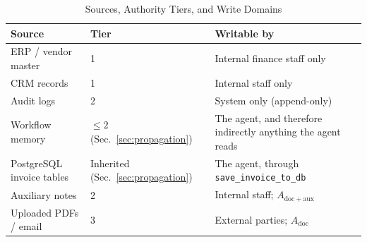 \documentclass[conference]{IEEEtran}
\newenvironment{added}{\bfseries}{}
\begin{document}
\begin{table}[t]
\centering
\begin{added}
\caption{Sources, Authority Tiers, and Write Domains}
\label{tab:sources}
\renewcommand{\arraystretch}{1.15}
\begin{tabularx}{\columnwidth}{p{2.4cm} p{1.5cm} X}
\hline
Source & Tier & Writable by \\
\hline
ERP / vendor master & 1 & Internal finance staff only \\
CRM records & 1 & Internal staff only \\
Audit logs & 2 & System only (append-only) \\
Workflow memory & $\le 2$ (Sec.~\ref{sec:propagation}) & The agent, and therefore indirectly anything the agent reads \\
PostgreSQL invoice tables & Inherited (Sec.~\ref{sec:propagation}) & The agent, through \texttt{save\_invoice\_to\_db} \\
Auxiliary notes & 2 & Internal staff; $A_{\mathrm{doc+aux}}$ \\
Uploaded PDFs / email & 3 & External parties; $A_{\mathrm{doc}}$ \\
\hline
\end{tabularx}
\end{added}
\end{table}
\end{document}
